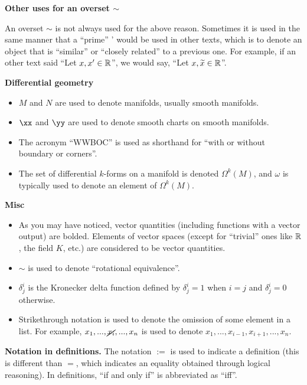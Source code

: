 \vspace{.25cm}

\textbf{Other uses for an overset $\sim$}

An overset $\sim$ is not always used for the above reason. Sometimes it is used in the same manner that a ``prime'' ' would be used in other texts, which is to denote an object that is ``similar'' or ``closely related'' to a previous one. For example, if an other text said ``Let $x, x' \in \mathbb{R}$'', we would say, ``Let $x, \widetilde{x} \in \mathbb{R}$''. 

\vspace{.25cm}

\textbf{Differential geometry}

\begin{itemize}
    \item $M$ and $N$ are used to denote manifolds, usually smooth manifolds.
    \item $\xx$ and $\yy$ are used to denote smooth charts on smooth manifolds.
    \item The acronym ``WWBOC'' is used as shorthand for ``with or without boundary or corners''.
    \item The set of differential $k$-forms on a manifold is denoted $\Omega^k(M)$, and $\omega$ is typically used to denote an element of $\Omega^k(M)$.
\end{itemize}

\textbf{Misc}

\begin{itemize}
    \item As you may have noticed, vector quantities (including functions with a vector output) are bolded. Elements of vector spaces (except for ``trivial'' ones like $\mathbb{R}$, the field $K$, etc.) are considered to be vector quantities.
    \item $\sim$ is used to denote ``rotational equivalence''.
    \item $\delta^i_j$ is the Kronecker delta function defined by $\delta^i_j = 1$ when $i = j$ and $\delta^i_j = 0$ otherwise.
    \item Strikethrough notation is used to denote the omission of some element in a list. For example, $x_1, ..., \cancel{x_i}, ..., x_n$ is used to denote $x_1, ..., x_{i - 1}, x_{i + 1}, ..., x_n$.
\end{itemize}

\vspace{.25cm}

\textbf{Notation in definitions.} The notation $:=$ is used to indicate a definition (this is different than $=$, which indicates an equality obtained through logical reasoning). In definitions, ``if and only if'' is abbreviated as ``iff''.

